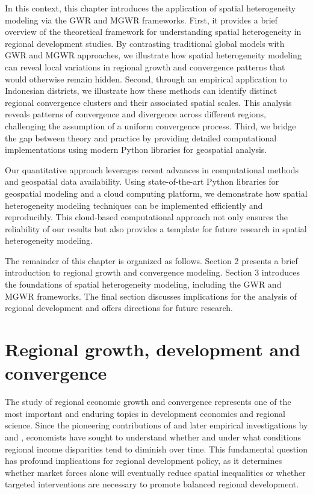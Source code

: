 \documentclass[smallextended, natbib]{svjour3}       %
\begin{document}
In this context, this chapter introduces the application of spatial heterogeneity modeling via the GWR and MGWR frameworks.
First, it provides a brief overview of the theoretical framework for understanding spatial heterogeneity in regional development studies.
By contrasting traditional global models with GWR and MGWR approaches, we illustrate how spatial heterogeneity modeling can reveal local variations in regional growth and convergence patterns that would otherwise remain hidden.
Second, through an empirical application to Indonesian districts, we illustrate how these methods can identify distinct regional convergence clusters and their associated spatial scales. 
This analysis reveals patterns of convergence and divergence across different regions, challenging the assumption of a uniform convergence process. 
Third, we bridge the gap between theory and practice by providing detailed computational implementations using modern Python libraries for geospatial analysis.

Our quantitative approach leverages recent advances in computational methods and geospatial data availability. 
Using state-of-the-art Python libraries for geospatial modeling and a cloud computing platform, we demonstrate how spatial heterogeneity modeling techniques can be implemented efficiently and reproducibly. 
This cloud-based computational approach not only ensures the reliability of our results but also provides a template for future research in spatial heterogeneity modeling.

The remainder of this chapter is organized as follows. 
Section 2 presents a brief introduction to regional growth and convergence modeling. 
Section 3 introduces the foundations of spatial heterogeneity modeling, including the GWR and MGWR frameworks. 
The final section discusses implications for the analysis of regional development and offers directions for future research.


\section{Regional growth, development and convergence}

The study of regional economic growth and convergence represents one of the most important and enduring topics in development economics and regional science. 
Since the pioneering contributions of \cite{solow1956contribution} and later empirical investigations by \cite{barro1991economic} and \cite{barro1992convergence}, economists have sought to understand whether and under what conditions regional income disparities tend to diminish over time. 
This fundamental question has profound implications for regional development policy, as it determines whether market forces alone will eventually reduce spatial inequalities or whether targeted interventions are necessary to promote balanced regional development.
\end{document}

